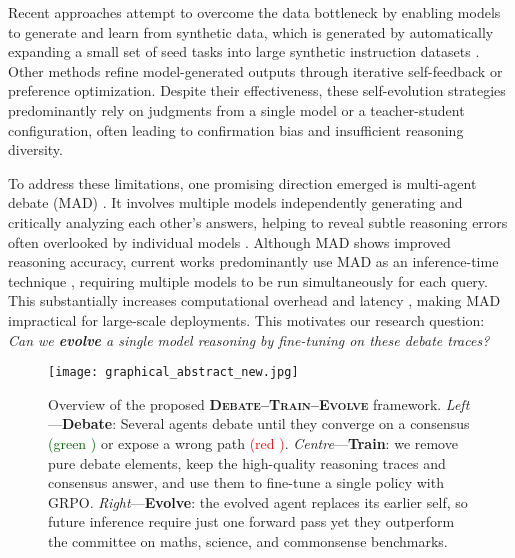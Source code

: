 \documentclass[11pt]{article}
\begin{document}
Recent approaches attempt to overcome the data bottleneck by enabling models to generate and learn from synthetic data, which is generated by automatically expanding a small set of seed tasks into large synthetic instruction datasets \cite{wang2022self, zeng2024automaticinstructionevolvinglarge}. Other methods \cite{madaan2023self, Jiang2023SelfEvolveAC, Gou2023CRITICLL, Peng2023CheckYF, zelikman2024star, costello2025think} refine model-generated outputs through iterative self-feedback or preference optimization. Despite their effectiveness, these self-evolution strategies predominantly rely on judgments from a single model or a teacher-student configuration, often leading to confirmation bias and insufficient reasoning diversity. 

To address these limitations, one promising direction emerged is multi-agent debate (MAD) \cite{du2023improving}. It involves multiple models independently generating and critically analyzing each other's answers, helping to reveal subtle reasoning errors often overlooked by individual models \cite{liang2023encouraging,Wang2024RethinkingTB}. Although MAD shows improved reasoning accuracy, current works predominantly use MAD as an inference-time technique \cite{smit2023should}, requiring multiple models to be run simultaneously for each query. This substantially increases computational overhead and latency \cite{subramaniam2025multiagent}, making MAD impractical for large-scale deployments. This motivates our research question: \emph{Can we \textbf{evolve} a single model reasoning by fine-tuning on these debate traces?} 

\begin{figure*}[ht]
    \centering
    \texttt{[image: graphical\_abstract\_new.jpg]}
            \caption{Overview of the proposed \textbf{\textsc{Debate–Train–Evolve}} framework. \textit{Left}—\textbf{Debate}: Several agents debate until they converge on a consensus \textcolor{darkgreen}{(green )} or expose a wrong path \textcolor{red}{(red )}. \textit{Centre}—\textbf{Train}: we remove pure debate elements, keep the high-quality reasoning traces and consensus answer, and use them to fine-tune a single policy with GRPO. \textit{Right}—\textbf{Evolve}: the evolved agent replaces its earlier self, so future inference require just one forward pass yet they outperform the committee on maths, science, and commonsense benchmarks.}
    \label{fig:main}
\end{figure*}
\end{document}

